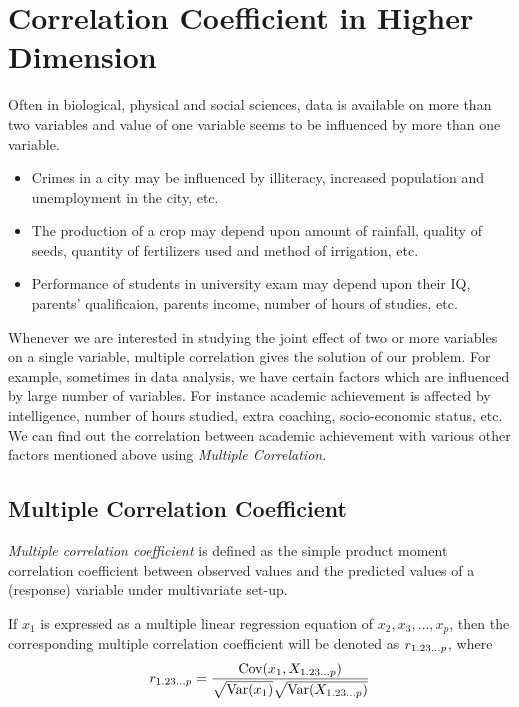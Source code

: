 \documentclass[10pt]{article}
\begin{document}
\section{Correlation Coefficient in Higher Dimension}
Often in biological, physical and social sciences, data is available on more than two variables and value of one variable seems to be influenced by more than one variable.

\begin{examples}    
	\begin{itemize}
		\item Crimes in a city may be influenced by illiteracy, increased population and unemployment in the city, etc.
		\item The production of a crop may depend upon amount of rainfall, quality of seeds, quantity of fertilizers used and method of irrigation, etc.
		\item Performance of students in university exam may depend upon their IQ, parents' qualificaion, parents income, number of hours of studies, etc.
	\end{itemize}
\end{examples}

Whenever we are interested in studying the joint effect of two or more variables on a single variable, multiple correlation gives the solution of our problem.
For example, sometimes in data analysis, we have certain factors which are influenced by large number of variables. 
For instance academic achievement is affected by intelligence, number of hours studied, extra coaching, socio-economic status, etc. 
We can find out the correlation between academic achievement with various other factors mentioned above using \textit{Multiple Correlation}.
\subsection{Multiple Correlation Coefficient}
\begin{definition}
	\emph{Multiple correlation coefficient} is defined as the simple product moment correlation coefficient between observed values and the predicted values of a (response) variable under multivariate set-up.

If \(x_1\) is expressed as a multiple linear regression equation of \(x_2, x_3, \dots, x_p\), then the corresponding multiple correlation coefficient will be denoted as \(r_{1.23\dots p}\), where
\begin{equation}
r_{1.23\dots p} = \frac{\operatorname{Cov}(x_1, X_{1.23\dots p})}{\sqrt{\operatorname{Var}(x_1)} \sqrt{\operatorname{Var}(X_{1.23\dots p})}} 
\end{equation}
\end{definition}
\end{document}
